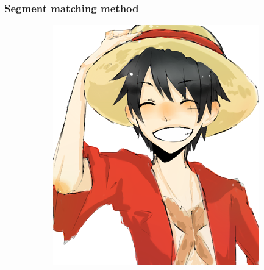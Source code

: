 \subsubsection{Segment matching method}
\label{sec:segmentMatching}
\begin{figure}[htb!]
\centering
\begin{subfigure}{0.24\textwidth}
\includegraphics[width=\textwidth]{images/rufy_d.png}
\end{subfigure}
\begin{subfigure}{0.24\textwidth}

\end{subfigure}
\end{figure}
